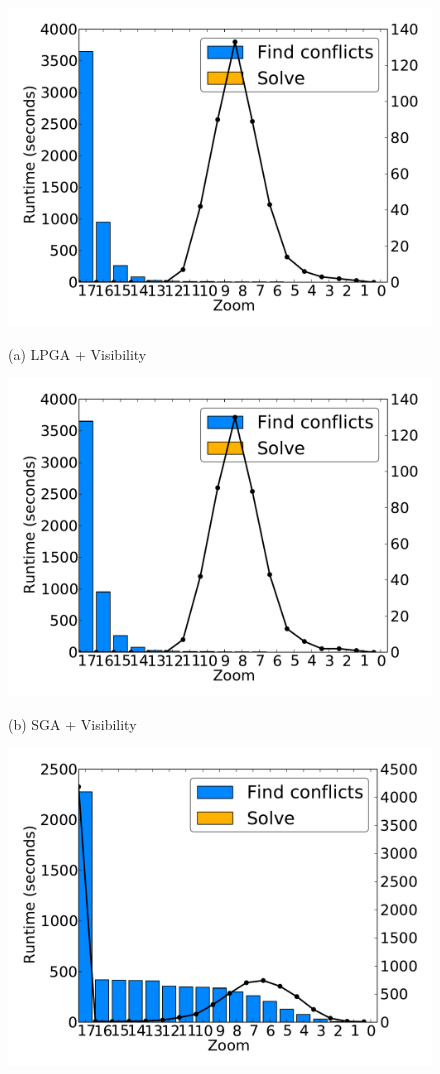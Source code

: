 \documentclass[11pt, oneside]{report}
\begin{document}
{\begin{figure}[tb]
  \begin{minipage}{0.329\linewidth}
    \centerline{\includegraphics[width=0.9\linewidth]{./figs-cvl/prelim_lin_30k_uswaterway_lp_A.pdf}}
    \centerline{(a) LPGA + Visibility}
  \end{minipage} \hfill
  \begin{minipage}{0.329\linewidth}
    \centerline{\includegraphics[width=0.9\linewidth]{./figs-cvl/prelim_lin_30k_uswaterway_heuristic_A.pdf}}
    \centerline{(b) SGA + Visibility}
  \end{minipage} \hfill
  \begin{minipage}{0.329\linewidth}
    \centerline{\includegraphics[width=0.9\linewidth]{./figs-cvl/prelim_lin_30k_uswaterway_lp_B.pdf}}

\end{minipage}
\end{figure}}
\end{document}
